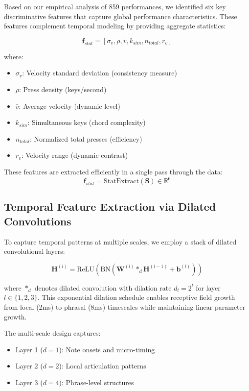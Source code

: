 Based on our empirical analysis of 859 performances, we identified six key discriminative features that capture global performance characteristics. These features complement temporal modeling by providing aggregate statistics:

\begin{equation}
\mathbf{f}_{stat} = [\sigma_v, \rho, \bar{v}, k_{sim}, n_{total}, r_v]
\end{equation}

where:
\begin{itemize}
\item $\sigma_v$: Velocity standard deviation (consistency measure)
\item $\rho$: Press density (keys/second)
\item $\bar{v}$: Average velocity (dynamic level)
\item $k_{sim}$: Simultaneous keys (chord complexity)
\item $n_{total}$: Normalized total presses (efficiency)
\item $r_v$: Velocity range (dynamic contrast)
\end{itemize}

These features are extracted efficiently in a single pass through the data:
\begin{equation}
\mathbf{f}_{stat} = \text{StatExtract}(\mathbf{S}) \in \mathbb{R}^6
\end{equation}

\subsection{Temporal Feature Extraction via Dilated Convolutions}

To capture temporal patterns at multiple scales, we employ a stack of dilated convolutional layers:

\begin{equation}
\mathbf{H}^{(l)} = \text{ReLU}(\text{BN}(\mathbf{W}^{(l)} *_d \mathbf{H}^{(l-1)} + \mathbf{b}^{(l)}))
\end{equation}

where $*_d$ denotes dilated convolution with dilation rate $d_l = 2^l$ for layer $l \in \{1,2,3\}$. This exponential dilation schedule enables receptive field growth from local (2ms) to phrasal (8ms) timescales while maintaining linear parameter growth.

The multi-scale design captures:
\begin{itemize}
\item Layer 1 ($d=1$): Note onsets and micro-timing
\item Layer 2 ($d=2$): Local articulation patterns
\item Layer 3 ($d=4$): Phrase-level structures
\end{itemize}

